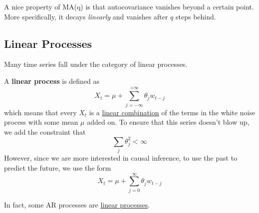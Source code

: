 \documentclass{article}
\begin{document}
  \begin{theorem}
    \label{thm:autocovariance-of-an-ma-q-process}
    A nice property of MA(q) is that autocovariance vanishes beyond a certain point. More specifically, it decays \textit{linearly} and vanishes after $q$ steps behind. 
  \end{theorem}

\subsection{Linear Processes}

  Many time series fall under the category of linear processes. 

  \begin{definition}
    \label{def:linear-processes}
    A \textbf{linear process} is defined as 
    \begin{equation}
      X_t = \mu + \sum_{j=-\infty}^{+\infty} \theta_j w_{t-j}
    \end{equation}
    which means that every $X_t$ is a \hyperref[lin-def:linear-combination]{linear combination} of the terms in the white noise process with some mean $\mu$ added on. To ensure that this series doesn't blow up, we add the constraint that 
    \begin{equation}
      \sum_{j} \theta_j^2 < \infty
    \end{equation}
    However, since we are more interested in causal inference, to use the past to predict the future, we use the form 
    \begin{equation}
      X_t = \mu + \sum_{j=0}^{\infty} \theta_j w_{t-j}
    \end{equation}
  \end{definition}

  In fact, some AR processes are \hyperref[def:linear-processes]{linear processes}. 
\end{document}
